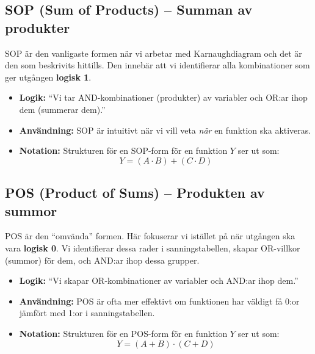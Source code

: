 \documentclass[
  swedish,
  letterpaper,
  oneside,
  openany]{book}
\providecommand{\tightlist}{%
  \setlength{\itemsep}{0pt}\setlength{\parskip}{0pt}}
\begin{document}
\subsection{SOP (Sum of Products) -- Summan av
produkter}\label{sop-sum-of-products-summan-av-produkter}

SOP är den vanligaste formen när vi arbetar med Karnaughdiagram och det
är den som beskrivits hittills. Den innebär att vi identifierar alla
kombinationer som ger utgången \textbf{logisk 1}.

\begin{itemize}
\tightlist
\item
  \textbf{Logik:} ``Vi tar AND-kombinationer (produkter) av variabler
  och OR:ar ihop dem (summerar dem).''
\item
  \textbf{Användning:} SOP är intuitivt när vi vill veta \emph{när} en
  funktion ska aktiveras.
\item
  \textbf{Notation:} Strukturen för en SOP-form för en funktion \(Y\)
  ser ut som: \[Y = (A \cdot B) + (C \cdot D)\]
\end{itemize}

\subsection{POS (Product of Sums) -- Produkten av
summor}\label{pos-product-of-sums-produkten-av-summor}

POS är den ``omvända'' formen. Här fokuserar vi istället på när utgången
ska vara \textbf{logisk 0}. Vi identifierar dessa rader i
sanningstabellen, skapar OR-villkor (summor) för dem, och AND:ar ihop
dessa grupper.

\begin{itemize}
\tightlist
\item
  \textbf{Logik:} ``Vi skapar OR-kombinationer av variabler och AND:ar
  ihop dem.''
\item
  \textbf{Användning:} POS är ofta mer effektivt om funktionen har
  väldigt få 0:or jämfört med 1:or i sanningstabellen.
\item
  \textbf{Notation:} Strukturen för en POS-form för en funktion \(Y\)
  ser ut som: \[Y = (A + B) \cdot (C + D)\]
\end{itemize}
\end{document}
